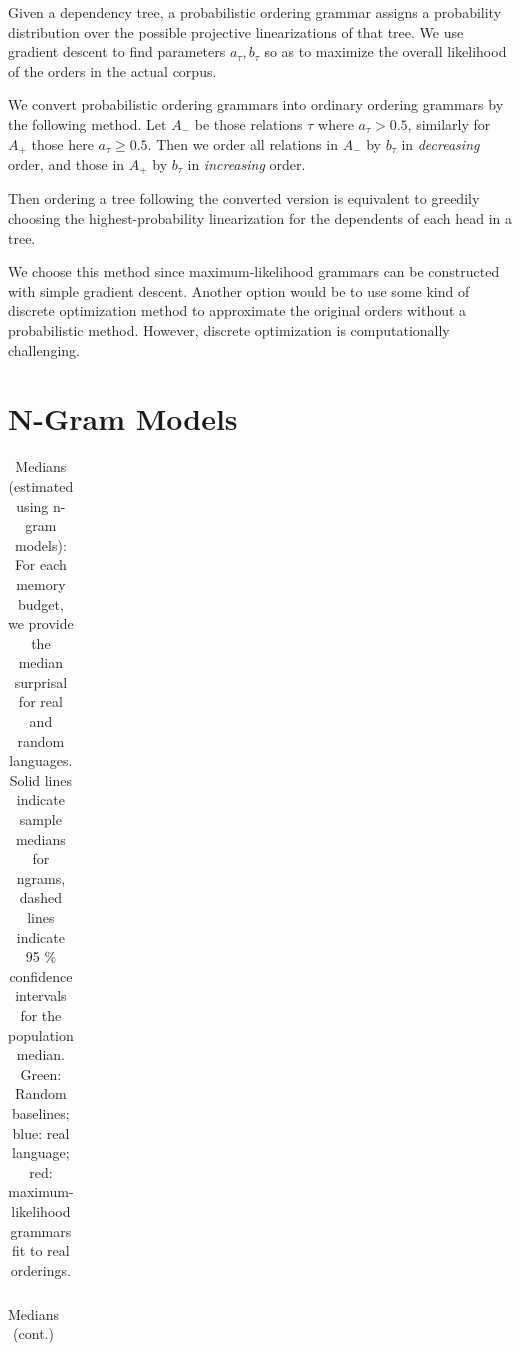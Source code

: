 \documentclass[11pt,letterpaper]{article}
\begin{document}
Given a dependency tree, a probabilistic ordering grammar assigns a probability distribution over the possible projective linearizations of that tree.
We use gradient descent to find parameters $a_\tau, b_\tau$ so as to maximize the overall likelihood of the orders in the actual corpus.


We convert probabilistic ordering grammars into ordinary ordering grammars by the following method.
Let $A_-$ be those relations $\tau$ where $a_\tau > 0.5$, similarly for $A_+$ those here $a_\tau \geq 0.5$.
Then we order all relations in $A_-$ by $b_\tau$ in \emph{decreasing} order, and those in $A_+$ by $b_\tau$ in \emph{increasing} order.

Then ordering a tree following the converted version is equivalent to greedily choosing the highest-probability linearization for the dependents of each head in a tree.


We choose this method since maximum-likelihood grammars can be constructed with simple gradient descent.
Another option would be to use some kind of discrete optimization method to approximate the original orders without a probabilistic method.
However, discrete optimization is computationally challenging.



\section{N-Gram Models}



\begin{table}
\begin{longtable}{ccccccccccccccclll}

\end{longtable}
	\caption{Medians (estimated using n-gram models): For each memory budget, we provide the median surprisal for real and random languages. Solid lines indicate sample medians for ngrams, dashed lines indicate 95 \% confidence intervals for the population median. Green: Random baselines; blue: real language; red: maximum-likelihood grammars fit to real orderings.}\label{tab:medians_ngrams}
\end{table}

\begin{table}
\begin{longtable}{ccccccccccccccclll}

\end{longtable}
	\caption{Medians (cont.)}
\end{table}
\end{document}
